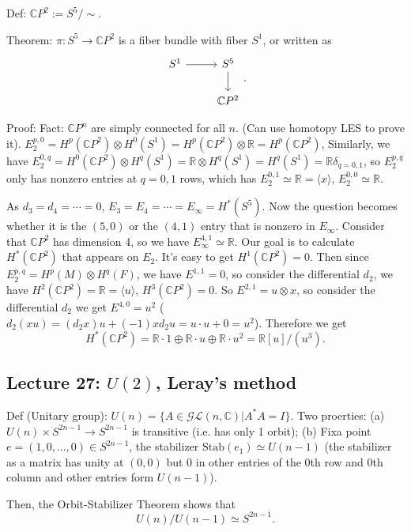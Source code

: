 \documentclass{article}
\theoremstyle{mystyle}
\theoremstyle{remark}
\numberwithin{equation}{section}
\begin{document}
Def: $\mathbb{C}P^2 := S^5/\sim$.

Theorem: $\pi\colon S^5\rightarrow \mathbb{C}P^2$ is a fiber bundle with fiber $S^1$, or written as
$$\begin{tikzcd} S^1\ar[r]& S^5\ar[d] \\&\mathbb{C}P^2\end{tikzcd}.$$

Proof: Fact: $\mathbb{C}P^n$ are simply connected for all $n$. (Can use homotopy LES to prove it). $E^{p,0}_2 = H^p(\mathbb{C}P^2)\otimes H^0(S^1) = H^p(\mathbb{C}P^2)\otimes \mathbb{R} = H^p(\mathbb{C}P^2)$, Similarly, we have $E^{0,q}_2 = H^0(\mathbb{C}P^2)\otimes H^q(S^1) = \mathbb{R}\otimes H^q(S^1) = H^q(S^1) = \mathbb{R} \delta_{q=0,1}$, so $E^{p,q}_2$ only has nonzero entries at $q=0,1$ rows, which has $E_2^{0,1} \simeq \mathbb{R} = \langle x\rangle$, $E_2^{0,0}\simeq \mathbb{R}$.

As $d_3=d_4=\cdots =0$, $E_3=E_4=\cdots = E_\infty = H^*(S^5)$. Now the question becomes whether it is the $(5,0)$ or the $(4,1)$ entry that is nonzero in $E_\infty$. Consider that $\mathbb{C}P^2$ has dimension 4, so we have $E_\infty^{4,1}\simeq \mathbb{R}$. Our goal is to calculate $H^*(\mathbb{C}P^2)$ that appears on $E_2$. It's easy to get $H^1(\mathbb{C}P^2)=0$. Then since $E_2^{p,q} =  H^p(M)\otimes H^q(F)$, we have $E^{1,1}=0$, so consider the differential $d_2$, we have $H^2(\mathbb{C}P^2)   = \mathbb{R} = \langle u\rangle$, $H^3(\mathbb{C}P^2)=0$. So $E^{2,1} = u\otimes x$, so consider the differential $d_2$ we get $E^{4,0} = u^2$ ($d_2(xu) = (d_2x)u+(-1)xd_2u = u\cdot u + 0 = u^2$). Therefore we get
$$H^*(\mathbb{C}P^2) = \mathbb{R}\cdot1\oplus \mathbb{R}\cdot u \oplus \mathbb{R}\cdot u^2
=\mathbb{R}[u]/(u^3).$$


\subsection{Lecture 27: $U(2)$, Leray's method}

Def (Unitary group): $U(n) = \{A\in \mathcal{GL}(n,\mathbb{C})|A^*A = I\}$. Two proerties: (a) $U(n)\times S^{2n-1}\rightarrow S^{2n-1}$ is transitive (i.e. has only 1 orbit); (b) Fixa point $e=(1,0,...,0)\in S^{2n-1}$, the stabilizer $\text{Stab}(e_1) \simeq U(n-1)$ (the stabilizer as a matrix has unity at $(0,0)$ but $0$ in other entries of the 0th row and 0th column and other entries form $U(n-1)$).

Then, the Orbit-Stabilizer Theorem shows that
$$U(n)/U(n-1) \simeq S^{2n-1}.$$
\end{document}
